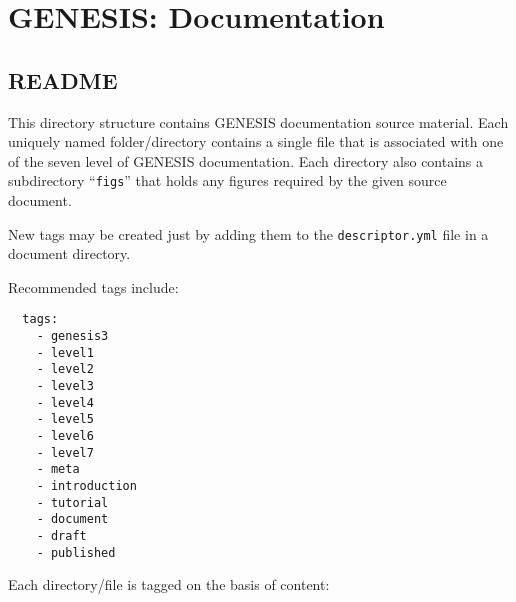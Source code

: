 \documentclass[12pt]{article}
\begin{document}
\section*{GENESIS: Documentation}

\subsection*{README}

This directory structure contains GENESIS documentation source material. Each uniquely named folder/directory contains a single file that is associated with one of the seven level of GENESIS documentation. Each directory also contains a subdirectory ``{\tt figs}'' that holds any figures required by the given source document.

New tags may be created just by adding them to the {\tt descriptor.yml} file in a document directory. 

Recommended tags include:
\begin{verbatim}
  tags:
    - genesis3
    - level1
    - level2
    - level3
    - level4
    - level5
    - level6
    - level7
    - meta
    - introduction
    - tutorial
    - document
    - draft
    - published
\end{verbatim}
Each directory/file is tagged on the basis of content:
\end{document}
